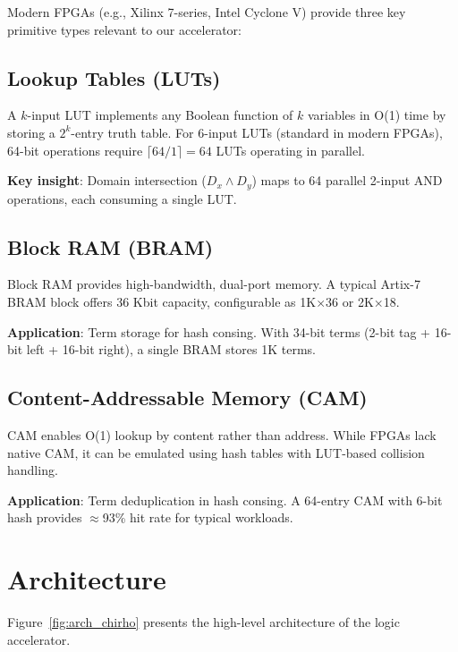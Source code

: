 \documentclass[11pt,a4paper]{article}
\begin{document}
Modern FPGAs (e.g., Xilinx 7-series, Intel Cyclone V) provide three key
primitive types relevant to our accelerator:

\subsection{Lookup Tables (LUTs)}
\label{subsec:luts_chirho}

A $k$-input LUT implements any Boolean function of $k$ variables in O(1) time
by storing a $2^k$-entry truth table. For 6-input LUTs (standard in modern
FPGAs), 64-bit operations require $\lceil 64/1 \rceil = 64$ LUTs operating in
parallel.

\textbf{Key insight}: Domain intersection ($D_x \land D_y$) maps to 64
parallel 2-input AND operations, each consuming a single LUT.

\subsection{Block RAM (BRAM)}
\label{subsec:bram_chirho}

Block RAM provides high-bandwidth, dual-port memory. A typical Artix-7 BRAM
block offers 36 Kbit capacity, configurable as 1K$\times$36 or 2K$\times$18.

\textbf{Application}: Term storage for hash consing. With 34-bit terms
(2-bit tag + 16-bit left + 16-bit right), a single BRAM stores 1K terms.

\subsection{Content-Addressable Memory (CAM)}
\label{subsec:cam_chirho}

CAM enables O(1) lookup by content rather than address. While FPGAs lack
native CAM, it can be emulated using hash tables with LUT-based collision
handling.

\textbf{Application}: Term deduplication in hash consing. A 64-entry CAM
with 6-bit hash provides $\approx$93\% hit rate for typical workloads.

\section{Architecture}
\label{sec:architecture_chirho}

Figure~\ref{fig:arch_chirho} presents the high-level architecture of the
logic accelerator.
\end{document}
